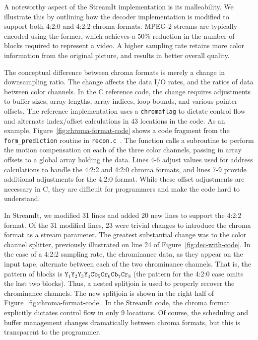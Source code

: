 \vspace{-8pt}A noteworthy aspect of the StreamIt implementation is its
malleability. We illustrate this by outlining how the decoder
implementation is modified to support both 4:2:0 and 4:2:2 chroma
formats. MPEG-2 streams are typically encoded using the former, which
achieves a 50\% reduction in the number of blocks required to
represent a video. A higher sampling rate retains more color
information from the original picture, and results in better overall
quality.

The conceptual difference between chroma formats is merely a change in
downsampling ratio. The change affects the data I/O rates, and the
ratios of data between color channels. In the C reference code, the
change requires adjustments to buffer sizes, array lengths, array
indices, loop bounds, and various pointer offsets. The reference implementation
uses a \texttt{chroma}{\newpage\noindent}\texttt{flag} to dictate control flow and alternate
index/offset calculations in 43 locations in the code. As an example,
Figure~\ref{fig:chroma-format-code} shows a code fragment from the
\texttt{form\_prediction} routine in
\texttt{recon.c}~\cite{reference-mpeg-c}. The function calls a
subroutine to perform the motion compensation on each of the three
color channels, passing in array offsets to a global array holding the
data. Lines 4-6 adjust values used for address calculations to handle
the 4:2:2 and 4:2:0 chroma formats, and lines 7-9 provide additional
adjustments for the 4:2:0 format. While these offset adjustments are
necessary in C, they are difficult for programmers and make the code
hard to understand.

In StreamIt, we modified 31 lines and added 20 new lines to support
the 4:2:2 format. Of the 31 modified lines, 23 were trivial changes to
introduce the chroma format as a stream parameter. The greatest
substantial change was to the color channel splitter, previously
illustrated on line 24 of Figure~\ref{fig:dec-with-code}. In the case
of a 4:2:2 sampling rate, the chrominance data, as they appear on the
input tape, alternate between each of the two chrominance
channels. That is, the pattern of blocks is $\texttt{Y}_1 \texttt{Y}_2
\texttt{Y}_3 \texttt{Y}_4 \texttt{Cb}_5 \texttt{Cr}_6 \texttt{Cb}_7
\texttt{Cr}_8$ (the pattern for the 4:2:0 case omits the last two
blocks). Thus, a nested splitjoin is used to properly recover the
chrominance channels. The new splitjoin is shown in the right half of
Figure~\ref{fig:chroma-format-code}.  In the StreamIt code, the chroma
format explicitly dictates control flow in only 9 locations. Of
course, the scheduling and buffer management changes dramatically
between chroma formats, but this is transparent to the programmer.

